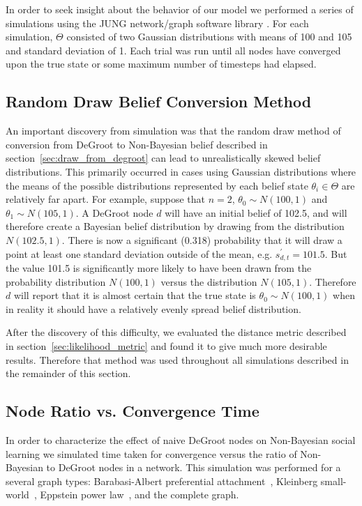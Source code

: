 \documentclass[letterpaper, 11pt, conference]{ieeeconf}
\begin{document}
In order to seek insight about the behavior of our model we performed a series of simulations using the JUNG network/graph software library \cite{website:JUNGGraphLibrary}.  For each simulation, $\Theta$ consisted of two Gaussian distributions with means of 100 and 105 and standard deviation of 1.  Each trial was run until all nodes have converged upon the true state or some maximum number of timesteps had elapsed.

\subsection{Random Draw Belief Conversion Method}

An important discovery from simulation was that the random draw method of conversion from DeGroot to Non-Bayesian belief described in section~\ref{sec:draw_from_degroot} can lead to unrealistically skewed belief distributions.  This primarily occurred in cases using Gaussian distributions where the means of the possible distributions represented by each belief state $\theta_i \in \Theta$ are relatively far apart.  For example, suppose that $n = 2$, $\theta_0 \sim N(100, 1)$ and $\theta_1 \sim N(105, 1)$.  A DeGroot node $d$ will have an initial belief of 102.5, and will therefore create a Bayesian belief distribution by drawing from the distribution $N(102.5, 1)$.  There is now a significant (0.318) probability that it will draw a point at least one standard deviation outside of the mean, e.g. $s_{d,t}^\prime = 101.5$.  But the value 101.5 is significantly more likely to have been drawn from the probability distribution $N(100, 1)$ versus the distribution $N(105, 1)$.  Therefore $d$ will report that it is almost certain that the true state is $\theta_0 \sim N(100, 1)$ when in reality it should have a relatively evenly spread belief distribution.

After the discovery of this difficulty, we evaluated the distance metric described in section~\ref{sec:likelihood_metric} and found it to give much more desirable results.  Therefore that method was used throughout all simulations described in the remainder of this section.

\subsection{Node Ratio vs. Convergence Time}
\label{sec:node_ratio_vs_convergence_time}

In order to characterize the effect of naive DeGroot nodes on Non-Bayesian social learning we simulated time taken for convergence versus the ratio of Non-Bayesian to DeGroot nodes in a network.  This simulation was performed for a several graph types: Barabasi-Albert preferential attachment~\cite{Barabasi}, Kleinberg small-world~\cite{KleinbergSmallWorld}, Eppstein power law~\cite{Eppstein}, and the complete graph.  
\end{document}
